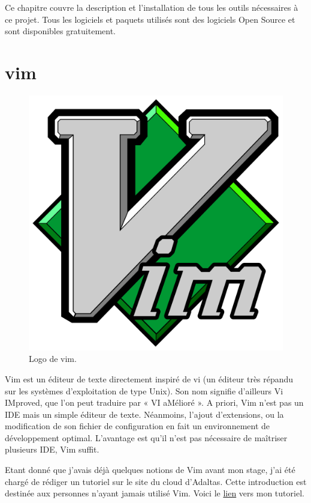 \documentclass[12pt, french]{report}
\begin{document}
Ce chapitre couvre la description et l'installation de tous les outils nécessaires à ce projet. Tous les logiciels et paquets utilisés sont des logiciels Open Source et sont disponibles gratuitement.

\section{vim}

\begin{figure}[H]
\includegraphics[scale=0.1]{assets/img/logo-vim.png}
\centering
\caption{Logo de vim.}
\label{fig:logo-adaltas}
\end{figure}

Vim est un éditeur de texte directement inspiré de vi (un éditeur très répandu sur les systèmes d’exploitation de type Unix). Son nom signifie d’ailleurs Vi IMproved, que l’on peut traduire par « VI aMélioré ». A priori, Vim n'est pas un IDE mais un simple éditeur de texte. Néanmoins, l'ajout  d'extensions, ou la modification de son fichier de configuration en fait un environnement de développement optimal. L'avantage est qu'il n'est pas nécessaire de maîtriser plusieurs IDE, Vim suffit.

Etant donné que j'avais déjà quelques notions de Vim avant mon stage, j'ai été chargé de rédiger un tutoriel sur le site du cloud d'Adaltas. Cette introduction est destinée aux personnes n'ayant jamais utilisé Vim. Voici le \href{https://www.adaltas.cloud/en/docs/foundations/vim/}{lien} vers mon tutoriel.
\end{document}
